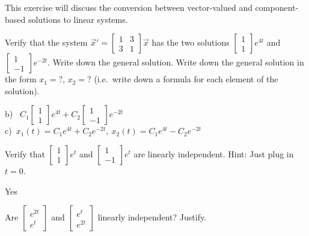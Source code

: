 \begin{exercise}
This exercise will discuss the conversion between vector-valued and component-based solutions to linear systems. 
\leavevmode
\begin{tasks}
\task
Verify that the system ${\vec{x}}' =
\left[ \begin{smallmatrix}
1 & 3 \\ 3 & 1
\end{smallmatrix} \right] \vec{x}$ has the two solutions
$\left[ \begin{smallmatrix}
1 \\ 1
\end{smallmatrix} \right] e^{4t}$ and
$\left[ \begin{smallmatrix}
1 \\ -1
\end{smallmatrix} \right] e^{-2t}$.
\task
Write down the general solution.
\task
Write down the general solution in the form $x_1 = ?$, $x_2 = ?$
(i.e.\ write down a formula for each element of the solution).
\end{tasks}
\end{exercise}
\comboSol{%
}
{%
b)~ $C_1\left[\begin{smallmatrix} 1 \\ 1 \end{smallmatrix}\right]e^{4t} + C_2\left[\begin{smallmatrix} 1 \\ -1 \end{smallmatrix}\right]e^{-2t}$ \\ c)~$x_1(t) = C_1e^{4t} + C_2e^{-2t},\ x_2(t) = C_1e^{4t} - C_2e^{-2t}$
}

\begin{exercise}
Verify that
$\left[ \begin{smallmatrix}
1 \\ 1
\end{smallmatrix} \right] e^{t}$ and
$\left[ \begin{smallmatrix}
1 \\ -1
\end{smallmatrix} \right] e^{t}$ 
are linearly independent.  Hint: Just plug in $t=0$.
\end{exercise}
\comboSol{%
}
{%
Yes
}


\begin{exercise}\ansMark%
Are
$\left[ \begin{smallmatrix}
e^{2t} \\ e^t
\end{smallmatrix}\right]$
and
$\left[ \begin{smallmatrix}
e^{t} \\ e^{2t}
\end{smallmatrix}\right]$
linearly independent?  Justify.
\end{exercise}

